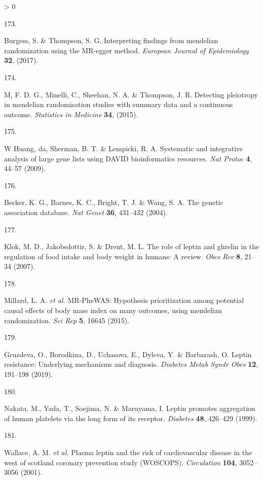 \documentclass[11pt,twoside]{bristolthesis}
\newlength{\cslhangindent}
\newlength{\csllabelwidth}
\newenvironment{CSLReferences}[2] %
 {%
  \setlength{\parindent}{0pt}
  \ifodd #1 \everypar{\setlength{\hangindent}{\cslhangindent}}\ignorespaces\fi
  \ifnum #2 > 0
  \setlength{\parskip}{#2\baselineskip}
  \fi
 }%
 {}
\newcommand{\CSLLeftMargin}[1]{\parbox[t]{\csllabelwidth}{#1}}
\newcommand{\CSLRightInline}[1]{\parbox[t]{\linewidth - \csllabelwidth}{#1}\break}
\begin{document}
\begin{CSLReferences}{0}{0}
\leavevmode\hypertarget{ref-Burgess2017}{}%
\CSLLeftMargin{173. }
\CSLRightInline{Burgess, S. \& Thompson, S. G. Interpreting findings from mendelian randomization using the MR-egger method. \emph{European Journal of Epidemiology} \textbf{32}, (2017).}

\leavevmode\hypertarget{ref-Greco2015}{}%
\CSLLeftMargin{174. }
\CSLRightInline{M, F. D. G., Minelli, C., Sheehan, N. A. \& Thompson, J. R. Detecting pleiotropy in mendelian randomisation studies with summary data and a continuous outcome. \emph{Statistics in Medicine} \textbf{34}, (2015).}

\leavevmode\hypertarget{ref-Huang2009}{}%
\CSLLeftMargin{175. }
\CSLRightInline{W Huang, da, Sherman, B. T. \& Lempicki, R. A. Systematic and integrative analysis of large gene lists using DAVID bioinformatics resources. \emph{Nat Protoc} \textbf{4}, 44--57 (2009).}

\leavevmode\hypertarget{ref-Becker2004a}{}%
\CSLLeftMargin{176. }
\CSLRightInline{Becker, K. G., Barnes, K. C., Bright, T. J. \& Wang, S. A. The genetic association database. \emph{Nat Genet} \textbf{36}, 431--432 (2004).}

\leavevmode\hypertarget{ref-Klok2007}{}%
\CSLLeftMargin{177. }
\CSLRightInline{Klok, M. D., Jakobsdottir, S. \& Drent, M. L. The role of leptin and ghrelin in the regulation of food intake and body weight in humans: A review. \emph{Obes Rev} \textbf{8}, 21--34 (2007).}

\leavevmode\hypertarget{ref-Millard2015}{}%
\CSLLeftMargin{178. }
\CSLRightInline{Millard, L. A. \emph{et al.} MR-PheWAS: Hypothesis prioritization among potential causal effects of body mass index on many outcomes, using mendelian randomization. \emph{Sci Rep} \textbf{5}, 16645 (2015).}

\leavevmode\hypertarget{ref-Gruzdeva2019a}{}%
\CSLLeftMargin{179. }
\CSLRightInline{Gruzdeva, O., Borodkina, D., Uchasova, E., Dyleva, Y. \& Barbarash, O. Leptin resistance: Underlying mechanisms and diagnosis. \emph{Diabetes Metab Syndr Obes} \textbf{12}, 191--198 (2019).}

\leavevmode\hypertarget{ref-Nakata1999}{}%
\CSLLeftMargin{180. }
\CSLRightInline{Nakata, M., Yada, T., Soejima, N. \& Maruyama, I. Leptin promotes aggregation of human platelets via the long form of its receptor. \emph{Diabetes} \textbf{48}, 426--429 (1999).}

\leavevmode\hypertarget{ref-Wallace2001}{}%
\CSLLeftMargin{181. }
\CSLRightInline{Wallace, A. M. \emph{et al.} Plasma leptin and the risk of cardiovascular disease in the west of scotland coronary prevention study (WOSCOPS). \emph{Circulation} \textbf{104}, 3052--3056 (2001).}


\end{CSLReferences}
\end{document}
